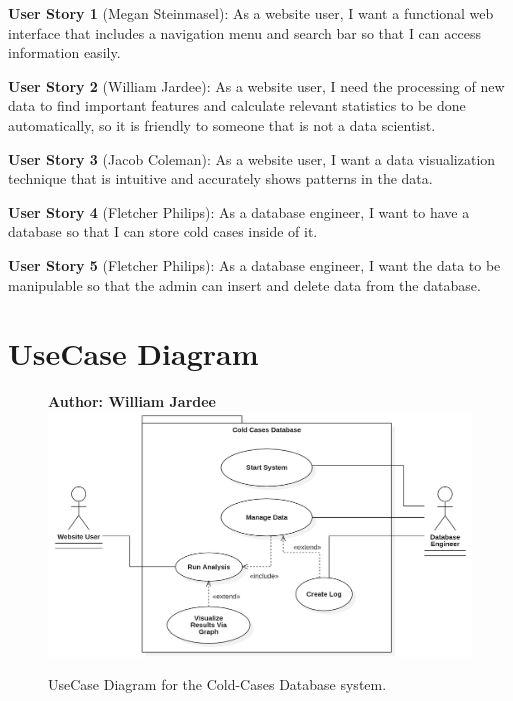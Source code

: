 \documentclass[11pt]{article}
\begin{document}
\noindent\textbf{\hypertarget{us1}{User Story 1}} (Megan Steinmasel):  As a website user, I want a functional web interface that includes a navigation menu and search bar so that I can access information easily.\vspace{0.5em}

\noindent\textbf{\hypertarget{us2}{User Story 2}} (William Jardee): As a website user, I need the processing of new data to find important features and calculate relevant statistics to be done automatically, so it is friendly to someone that is not a data scientist.\vspace{0.5em}

\noindent\textbf{\hypertarget{us3}{User Story 3}} (Jacob Coleman): As a website user, I want a data visualization technique that is intuitive and accurately shows patterns in the data.\vspace{0.5em}

\noindent\textbf{\hypertarget{us4}{User Story 4}} (Fletcher Philips): As a database engineer, I want to have a database so that I can store cold cases inside of it. \vspace{0.5em}

\noindent\textbf{\hypertarget{us5}{User Story 5}} (Fletcher Philips): As a database engineer, I want the data to be manipulable so that the admin can insert and delete data from the database.\vspace{0.5em}

\clearpage



\section{UseCase Diagram}

\begin{figure}[!ht]
\centering
\textbf{Author: William Jardee}
	\includegraphics[width=.95\textwidth]{./UseCases/jardee_usecase}\\
	\caption{UseCase Diagram for the Cold-Cases Database system.}
	\label{fig:usecase_diagram}
\end{figure}
\clearpage
\end{document}
